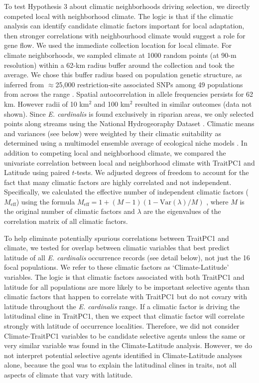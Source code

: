 \documentclass[11pt, oneside]{article}
\begin{document}
To test Hypothesis 3 about climatic neighborhoods driving selection, we directly competed local with neighborhood climate. The logic is that if the climatic analysis can identify candidate climatic factors important for local adaptation, then stronger correlations with neighbourhood climate would suggest a role for gene flow. We used the immediate collection location for local climate. For climate neighborhoods, we sampled climate at 1000 random points (at 90-m resolution) within a 62-km radius buffer around the collection and took the average. We chose this buffer radius based on population genetic structure, as inferred from $\approx$25,000 restriction-site associated SNPs among 49 populations from across the range \citep{Paul_etal_2016}. Spatial autocorrelation in allele frequencies persists for 62 km. However radii of 10 km$^2$ and 100 km$^2$ resulted in similar outcomes (data not shown). Since \textit{E. cardinalis} is found exclusively in riparian areas, we only selected points along streams using the National Hydrogeoraphy Dataset \citep{NHD}. Climatic means and variances (see below) were weighted by their climatic suitability as determined using a multimodel ensemble average of ecological niche models \citep{Angert_ENM}. In addition to competing local and neighborhood climate, we compared the univariate correlation between local and neighborhood climate with TraitPC1 and Latitude using paired $t$-tests. We adjusted degrees of freedom to account for the fact that many climatic factors are highly correlated and not independent. Specifically, we calculated the effective number of independent climatic factors ($M_\text{eff}$) using the formula $M_\text{eff} = 1 + (M - 1) (1 - \text{Var}(\lambda) / M)$ \citep{Chevrud_2001}, where $M$ is the original number of climatic factors and $\lambda$ are the eigenvalues of the correlation matrix of all climatic factors. 

To help eliminate potentially spurious correlations between TraitPC1 and climate, we tested for overlap between climatic variables that best predict latitude of all \textit{E. cardinalis} occurrence records (see detail below), not just the 16 focal populations. We refer to these climatic factors as `Climate-Latitude' variables. The logic is that climatic factors associated with both TraitPC1 and latitude for all populations are more likely to be important selective agents than climatic factors that happen to correlate with TraitPC1 but do not covary with latitude throughout the \textit{E. cardinalis} range. If a climatic factor is driving the latitudinal cline in TraitPC1, then we expect that climatic factor will correlate strongly with latitude of occurrence localities. Therefore, we did not consider Climate-TraitPC1 variables to be candidate selective agents unless the same or very similar variable was found in the Climate-Latitude analysis. However, we do not interpret potential selective agents identified in Climate-Latitude analyses alone, because the goal was to explain the latitudinal clines in traits, not all aspects of climate that vary with latitude.
\end{document}
